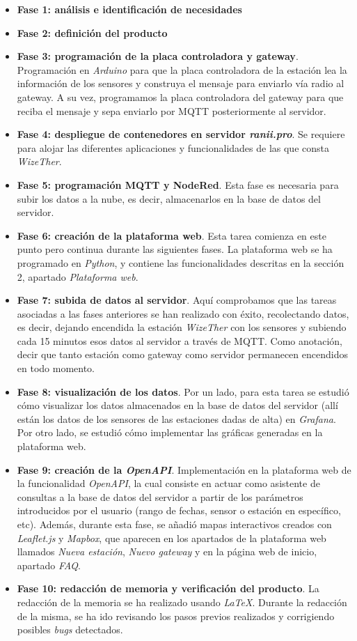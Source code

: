 \documentclass[12pt]{article}
\begin{document}
\begin{itemize}
	\item \textbf{Fase 1: análisis e identificación de necesidades}
	\item \textbf{Fase 2: definición del producto}
	\item \textbf{Fase 3: programación de la placa controladora y gateway}. Programación en \textit{Arduino} para que la placa controladora de la estación lea la información de los sensores y construya el mensaje para enviarlo vía radio al gateway. A su vez, programamos la placa controladora del gateway para que reciba el mensaje y sepa enviarlo por MQTT posteriormente al servidor.
	\item \textbf{Fase 4: despliegue de contenedores en servidor \textit{ranii.pro}}. Se requiere para alojar las diferentes aplicaciones y funcionalidades de las que consta \textit{WizeTher}.
	\item  \textbf{Fase 5: programación MQTT y NodeRed}. Esta fase es necesaria para subir los datos a la nube, es decir, almacenarlos en la base de datos del servidor.
	\item \textbf{Fase 6: creación de la plataforma web}. Esta tarea comienza en este punto pero continua durante las siguientes fases. La plataforma web se ha programado en \textit{Python}, y contiene las funcionalidades descritas en la sección 2, apartado \textit{Plataforma web}.
	\item \textbf{Fase 7: subida de datos al servidor}. Aquí comprobamos que las tareas asociadas a las fases anteriores se han realizado con éxito, recolectando datos, es decir, dejando encendida la estación \textit{WizeTher} con los sensores y subiendo cada 15 minutos esos datos al servidor a través de MQTT. Como anotación, decir que tanto estación como gateway como servidor permanecen encendidos en todo momento.
	\item \textbf{Fase 8: visualización de los datos}. Por un lado, para esta tarea se estudió cómo visualizar los datos almacenados en la base de datos del servidor (allí están los datos de los sensores de las estaciones dadas de alta) en \textit{Grafana}. Por otro lado, se estudió cómo implementar las gráficas generadas en la plataforma web.
	\item \textbf{Fase 9: creación de la \textit{OpenAPI}}. Implementación en la plataforma web de la funcionalidad \textit{OpenAPI}, la cual consiste en actuar como asistente de consultas a la base de datos del servidor a partir de los parámetros introducidos por el usuario (rango de fechas, sensor o estación en específico, etc). Además, durante esta fase, se añadió mapas interactivos creados con \textit{Leaflet.js} y \textit{Mapbox}, que aparecen en los apartados de la plataforma web llamados \textit{Nueva estación}, \textit{Nuevo gateway} y en la página web de inicio, apartado \textit{FAQ}.
	\item \textbf{Fase 10: redacción de memoria y verificación del producto}. La redacción de la memoria se ha realizado usando \textit{LaTeX}. Durante la redacción de la misma, se ha ido revisando los pasos previos realizados y corrigiendo posibles \textit{bugs} detectados.
\end{itemize}
\end{document}
